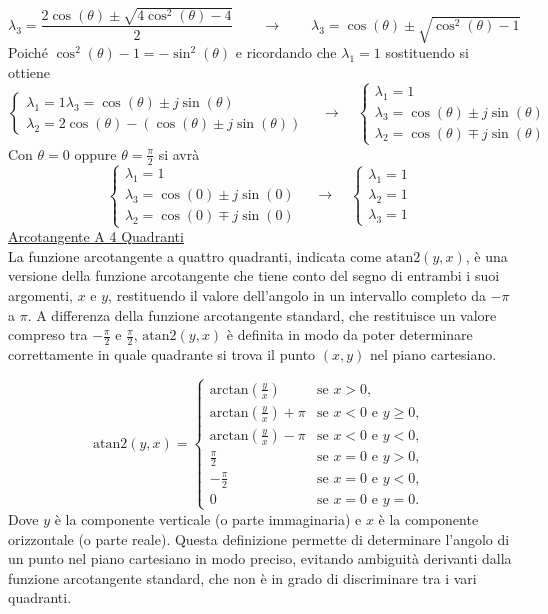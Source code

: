 \documentclass[11pt, a4paper]{report}
\begin{document}
\[
    \lambda_{3} = \frac{2\cos(\theta) \pm \sqrt{4\cos^2(\theta) - 4}}{2}
    \qquad\longrightarrow\qquad
    \lambda_{3} = \cos(\theta) \pm \sqrt{\cos^2(\theta) - 1}
\]
Poiché \(\cos^2(\theta) - 1 = -\sin^2(\theta)\) e ricordando che $\lambda_{1} = 1$ sostituendo si ottiene
\[
    \begin{cases}
        \lambda_{1} = 1
        \lambda_{3} = \cos(\theta) \pm j\sin(\theta)\\
        \lambda_{2} = 2\cos(\theta) - (\cos(\theta) \pm j\sin(\theta))
    \end{cases}
    \quad\longrightarrow\quad
    \begin{cases}
        \lambda_{1} = 1\\
        \lambda_{3} = \cos(\theta) \pm j\sin(\theta)\\
        \lambda_{2} = \cos(\theta) \mp j\sin(\theta)
    \end{cases}
\]
Con $\theta = 0$ oppure $\theta = \frac{\pi}{2}$ si avrà
\[
    \begin{cases}
        \lambda_{1} = 1\\
        \lambda_{3} = \cos(0) \pm j\sin(0)\\
        \lambda_{2} = \cos(0) \mp j\sin(0)
    \end{cases}
    \quad\longrightarrow\quad
    \begin{cases}
        \lambda_{1} = 1\\
        \lambda_{2} = 1\\
        \lambda_{3} = 1
    \end{cases}
\]
\underline{Arcotangente A 4 Quadranti}\\
La funzione arcotangente a quattro quadranti, indicata come \(\text{atan2}(y, x)\), è una versione della funzione arcotangente che tiene conto del segno di entrambi i suoi argomenti, \(x\) e \(y\), restituendo il valore dell'angolo in un intervallo completo da \(-\pi\) a \(\pi\). A differenza della funzione arcotangente standard, che restituisce un valore compreso tra \(-\frac{\pi}{2}\) e \(\frac{\pi}{2}\), \(\text{atan2}(y, x)\) è definita in modo da poter determinare correttamente in quale quadrante si trova il punto \((x, y)\) nel piano cartesiano.

\[
\text{atan2}(y, x) =
\begin{cases}
\text{arctan}\left(\frac{y}{x}\right) & \text{se } x > 0, \\
\text{arctan}\left(\frac{y}{x}\right) + \pi & \text{se } x < 0 \text{ e } y \geq 0, \\
\text{arctan}\left(\frac{y}{x}\right) - \pi & \text{se } x < 0 \text{ e } y < 0, \\
\frac{\pi}{2} & \text{se } x = 0 \text{ e } y > 0, \\
-\frac{\pi}{2} & \text{se } x = 0 \text{ e } y < 0, \\
0 & \text{se } x = 0 \text{ e } y = 0.
\end{cases}
\]
Dove \(y\) è la componente verticale (o parte immaginaria) e \(x\) è la componente orizzontale (o parte reale).
Questa definizione permette di determinare l'angolo di un punto nel piano cartesiano in modo preciso, evitando ambiguità derivanti dalla funzione arcotangente standard, che non è in grado di discriminare tra i vari quadranti.
\newpage
\end{document}
